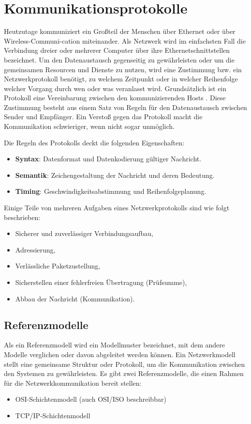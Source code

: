 \section{Kommunikationsprotokolle}\label{chapter:protokoll}

Heutzutage kommuniziert ein Großteil der Menschen über Ethernet oder über Wireless-Communi-cation miteinander. Als Netzwerk wird im einfachsten Fall die Verbindung dreier oder mehrerer Computer über ihre Ethernetschnittstellen bezeichnet. Um den Datenaustausch gegenseitig zu gewährleisten oder um die gemeinsamen Resourcen und Dienste zu nutzen, wird eine Zustimmung bzw. ein Netzwerkprotokoll benötigt, zu welchem Zeitpunkt oder in welcher Reihenfolge welcher Vorgang durch wen oder was veranlasst wird. Grundsätzlich ist ein Protokoll eine Vereinbarung zwischen den kommunizierenden Hosts \cite{Tanenbaum:2010:CN:1942194}. Diese Zustimmung besteht aus einem Satz von Regeln für den Datenaustausch zwischen Sender und Empfänger. Ein Verstoß gegen das Protokoll macht die Kommunikation schwieriger, wenn nicht sogar unmöglich. \smallskip \smallskip

Die Regeln des Protokolls deckt die folgenden Eigenschaften:
\begin{itemize}
	\item \textbf{Syntax}: Datenformat und Datenkodierung gültiger Nachricht.
	\item \textbf{Semantik}: Zeichengestaltung der Nachricht und deren Bedeutung.
	\item \textbf{Timing}: Geschwindigkeitsabstimmung und Reihenfolgeplanung.
\end{itemize}

Einige Teile von mehreren Aufgaben eines Netzwerkprotokolls sind wie folgt beschrieben:
\begin{itemize}
	\item Sicherer und zuverlässiger Verbindungsaufbau,
	\item Adressierung,
	\item Verlässliche Paketzustellung,
	\item Sicherstellen einer fehlerfreien Übertragung (Prüfsumme),
	\item Abbau der Nachricht (Kommunikation).
\end{itemize}

\subsection{Referenzmodelle}
Als ein Referenzmodell wird ein Modellmuster bezeichnet, mit dem andere Modelle verglichen oder davon abgeleitet werden können. Ein Netzwerkmodell stellt eine gemeinsame Struktur oder Protokoll, um die Kommunikation zwischen den Systemen zu gewährleisten. Es gibt zwei Referenzmodelle, die einen Rahmen für die Netzwerkkommunikation bereit stellen:
\begin{itemize}
	\item OSI-Schichtenmodell (auch OSI/ISO beschreibbar)
	\item TCP/IP-Schichtenmodell
\end{itemize}

